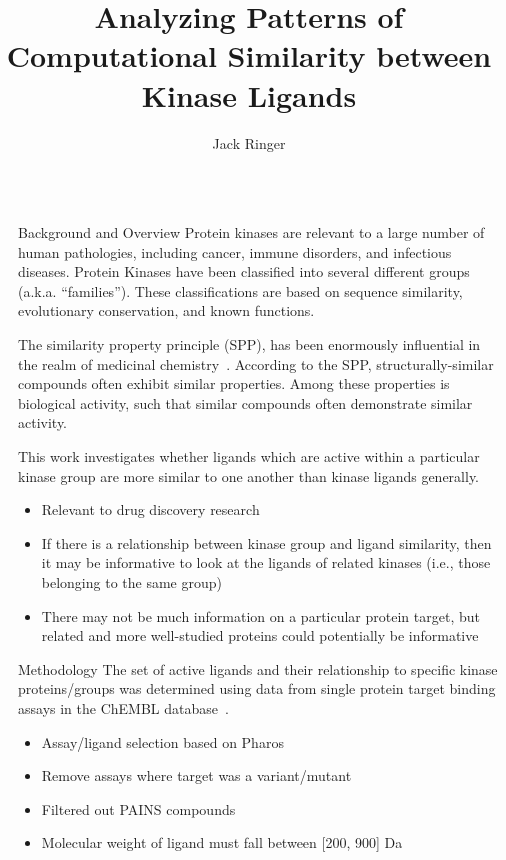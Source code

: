 \documentclass[final]{beamer}
\title{Analyzing Patterns of Computational Similarity between Kinase Ligands}
\author{Jack Ringer}
\institute[shortinst]{University of New Mexico}
\newlength{\sepwidth}
\newlength{\colwidth}
\newcommand{\separatorcolumn}{\begin{column}{\sepwidth}\end{column}}
\begin{document}
\begin{frame}[t]
\begin{columns}[t]
\separatorcolumn

\begin{column}{\colwidth}

  \begin{block}{Background and Overview}
   Protein kinases are relevant to a large number of human pathologies, including cancer, immune disorders, and infectious diseases. Protein Kinases have been classified into several different groups (a.k.a. ``families''). These classifications are based on sequence similarity, evolutionary conservation, and known functions. 


The similarity property principle (SPP), has been enormously influential in the realm of medicinal chemistry~\cite{maggiora_vogt_stumpfe_bajorath_2013}. According to the SPP, structurally-similar compounds often exhibit similar properties. Among these properties is biological activity, such that similar compounds often demonstrate similar activity. 

This work investigates whether ligands which are active within a particular kinase group are more similar to one another than kinase ligands generally. 
    \begin{itemize}
        \item Relevant to drug discovery research
        \item If there is a relationship between kinase group and ligand similarity, then it may be informative to look at the ligands of related kinases (i.e., those belonging to the same group)
        \item There may not be much information on a particular protein target, but related and more well-studied proteins could potentially be informative
    \end{itemize}

  \end{block}

  \begin{block}{Methodology}
    The set of active ligands and their relationship to specific kinase proteins/groups was determined using data from single protein target binding assays in the ChEMBL database~\cite{chembl_db_2023}. 
    \begin{itemize}
        \item Assay/ligand selection based on Pharos~\cite{pharos_2022}
        \item Remove assays where target was a variant/mutant
        \item Filtered out PAINS compounds
        \item Molecular weight of ligand must fall between [200, 900] Da
    \end{itemize}


\end{block}
\end{column}
\end{columns}
\end{frame}
\end{document}
